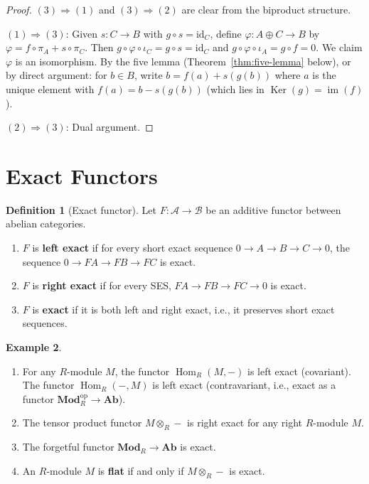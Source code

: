 \documentclass[a4paper,12pt]{book}
\DeclareMathOperator{\Hom}{Hom}
\DeclareMathOperator{\im}{im}
\DeclareMathOperator{\Ker}{Ker}
\newcommand{\Ab}{\mathbf{Ab}}
\newcommand{\Mod}{\mathbf{Mod}}
\newcommand{\op}{\mathrm{op}}
\newcommand{\id}{\mathrm{id}}
\theoremstyle{definition}
\newtheorem{definition}{Definition}[section]
\newtheorem{example}[definition]{Example}
\theoremstyle{plain}
\theoremstyle{remark}
\begin{document}
\begin{proof}
$(3) \Rightarrow (1)$ and $(3) \Rightarrow (2)$ are clear from the biproduct structure.

$(1) \Rightarrow (3)$: Given $s \colon C \to B$ with $g \circ s = \id_C$, define
$\varphi \colon A \oplus C \to B$ by $\varphi = f \circ \pi_A + s \circ \pi_C$.
Then $g \circ \varphi \circ \iota_C = g \circ s = \id_C$ and
$g \circ \varphi \circ \iota_A = g \circ f = 0$. We claim $\varphi$ is an isomorphism.
By the five lemma (Theorem~\ref{thm:five-lemma} below), or by direct argument:
for $b \in B$, write $b = f(a) + s(g(b))$ where $a$ is the unique element with
$f(a) = b - s(g(b))$ (which lies in $\Ker(g) = \im(f)$).

$(2) \Rightarrow (3)$: Dual argument.
\end{proof}


\section{Exact Functors}\label{sec:exact-functors}

\begin{definition}[Exact functor]\label{def:exact-functor}
Let $F \colon \mathcal{A} \to \mathcal{B}$ be an additive functor between abelian categories.
\begin{enumerate}
    \item $F$ is \textbf{left exact} if for every short exact sequence
    $0 \to A \to B \to C \to 0$, the sequence $0 \to FA \to FB \to FC$ is exact.
    \item $F$ is \textbf{right exact} if for every SES, $FA \to FB \to FC \to 0$ is exact.
    \item $F$ is \textbf{exact} if it is both left and right exact, i.e., it preserves
    short exact sequences.
\end{enumerate}
\end{definition}

\begin{example}\label{ex:exact-functors}
\begin{enumerate}
    \item\index{Hom@$\Hom$!left exactness}
    For any $R$-module $M$, the functor $\Hom_R(M, -)$ is left exact (covariant).
    The functor $\Hom_R(-, M)$ is left exact (contravariant, i.e., exact as a functor
    $\Mod_R^{\op} \to \Ab$).
    \item{}
    The tensor product functor $M \otimes_R -$ is right exact for any right $R$-module $M$.
    \item The forgetful functor $\Mod_R \to \Ab$ is exact.
    \item{}
    An $R$-module $M$ is \textbf{flat} if and only if $M \otimes_R -$ is exact.
\end{enumerate}
\end{example}
\end{document}
